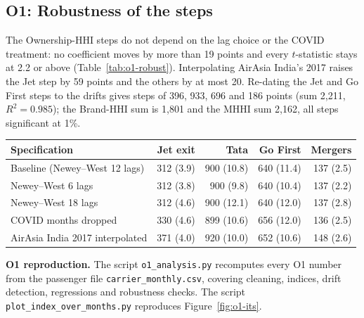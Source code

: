 \documentclass[12pt,a4paper]{article}
\newif\ifoneon
\newcommand{\oneHL}{\par\oneontrue\color{orange}\captionsetup{font+={color=blue}}}
\begin{document}
{\oneHL \subsection{O1: Robustness of the steps}
\label{app:o1-robust}
The Ownership-HHI steps do not depend on the lag choice or the COVID treatment: no coefficient moves by more than 19 points and every $t$-statistic stays at 2.2 or above (Table~\ref{tab:o1-robust}). Interpolating AirAsia India's 2017 raises the Jet step by 59 points and the others by at most 20. Re-dating the Jet and Go First steps to the drifts gives steps of 396, 933, 696 and 186 points (sum 2,211, $R^2=0.985$); the Brand-HHI sum is 1,801 and the MHHI sum 2,162, all steps significant at 1\%.

\begin{minipage}{\linewidth}
\label{tab:o1-robust}
\centering
{\small{}\setlength{\tabcolsep}{5pt}
\begin{tabular}{@{}lrrrr@{}}
\toprule
Specification & Jet exit & Tata & Go First & Mergers \\
\midrule
Baseline (Newey--West 12 lags) & 312 (3.9) & 900 (10.8) & 640 (11.4) & 137 (2.5) \\
Newey--West 6 lags & 312 (3.8) & 900 (9.8) & 640 (10.4) & 137 (2.2) \\
Newey--West 18 lags & 312 (4.6) & 900 (12.1) & 640 (12.0) & 137 (2.8) \\
COVID months dropped & 330 (4.6) & 899 (10.6) & 656 (12.0) & 136 (2.5) \\
AirAsia India 2017 interpolated & 371 (4.0) & 920 (10.0) & 652 (10.6) & 148 (2.6) \\
\bottomrule
\end{tabular}\par}
\end{minipage}
\vspace{0.8em}
\textbf{O1 reproduction.} The script \texttt{o1\_analysis.py} recomputes every O1 number from the passenger file \texttt{carrier\_monthly.csv}, covering cleaning, indices, drift detection, regressions and robustness checks. The script \texttt{plot\_index\_over\_\allowbreak months.py} reproduces Figure~\ref{fig:o1-its}.
\par}

\clearpage
\end{document}
